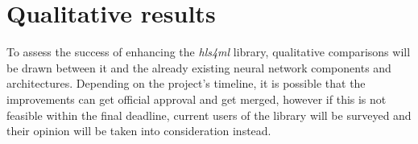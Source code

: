 
\section{Qualitative results}
To assess the success of enhancing the \textit{hls4ml} library, qualitative comparisons will be drawn between it and the already existing neural network components and architectures. Depending on the project's timeline, it is possible that the improvements can get official approval and get merged, however if this is not feasible within the final deadline, current users of the library will be surveyed and their opinion will be taken into consideration instead.

